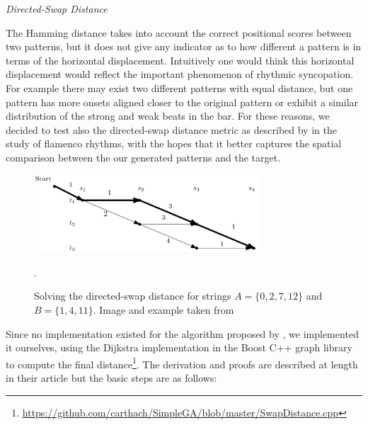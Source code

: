 \textit{Directed-Swap Distance}

\label{sec:directed_swap}

The Hamming distance takes into account the correct positional scores between two patterns, but it does not give any indicator as to how different a pattern is in terms of the horizontal displacement. Intuitively one would think this horizontal displacement would reflect the important phenomenon of rhythmic syncopation. For example there may exist two different patterns with equal distance, but one pattern has more onsets aligned closer to the original pattern or exhibit a similar distribution of the strong and weak beats in the bar. For these reasons, we decided to test also the directed-swap distance metric as described by \cite{Diaz-Banez2004} in the study of flamenco rhythms, with the hopes that it better captures the spatial comparison between the our generated patterns and the target.

\begin{figure}
	\begin{center}
		\includegraphics[width=0.75\textwidth]{ch03_symbolic/figures/shortest_path.png}
	\end{center}
	\caption[Solving the Directed-Swap Distance Graph for Two Strings]{Solving the directed-swap distance for strings $A=\{0,2,7,12\}$ and $B=\{1,4,11\}$. Image and example taken from \cite{Colannino2005}}.
	\label{fig:dijkstra}
\end{figure}

Since no implementation existed for the algorithm proposed by \cite{Colannino2005}, we implemented it ourselves, using the Dijkstra implementation in the Boost C++ graph library \citep{Siek2002} to compute the final distance\footnote{\url{https://github.com/carthach/SimpleGA/blob/master/SwapDistance.cpp}}. The derivation and proofs are described at length in their article \citep{Colannino2005} but the basic steps are as follows:

